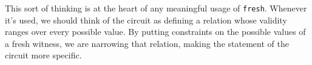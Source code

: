 This sort of thinking is at the heart of any meaningful usage of \lstinline{fresh}. Whenever it's used, we should think of the circuit as defining a relation whose validity ranges over every possible value. By putting constraints on the possible values of a fresh witness, we are narrowing that relation, making the statement of the circuit more specific.